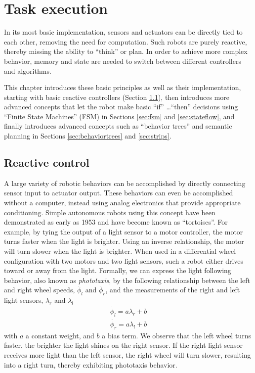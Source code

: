 \chapter{Task execution}
In its most basic implementation, sensors and actuators can be directly tied to each other, removing the need for computation. Such robots are purely reactive, thereby missing the ability to ``think'' or plan. In order to achieve more complex behavior, memory and state are needed to switch between different controllers and algorithms.

This chapter introduces these basic principles as well as their implementation, starting with basic reactive controllers (Section \ref{sec:braitenberg}), then introduces more advanced concepts that let the robot make basic ``if'' \ldots ``then'' decisions using ``Finite State Machines'' (FSM) in Sections \ref{sec:fsm} and \ref{sec:stateflow}, and finally introduces advanced concepts such as ``behavior trees'' and semantic planning in Sections \ref{sec:behaviortrees} and \ref{sec:strips}.

\section{Reactive control}\label{sec:braitenberg}
A large variety of robotic behaviors can be accomplished by directly connecting sensor input to actuator output. These behaviors can even be accomplished without a computer, instead using analog electronics that provide appropriate conditioning. Simple autonomous robots using this concept have been demonstrated as early as 1953 \cite{walter1953living} and have become known as ``tortoises''. For example, by tying the output of a light sensor to a motor controller, the motor turns faster when the light is brighter. Using an inverse relationship, the motor will turn slower when the light is brighter. When used in a differential wheel configuration with two motors and two light sensors, such a robot either drives toward or away from the light. Formally, we can express the light following behavior, also known as \emph{phototaxis}, by the following relationship between 
the left and right wheel speeds, $\dot{\phi_l}$ and $\dot{\phi_r}$, and the measurements of the right and left light sensors, $\lambda_r$ and $\lambda_l$
\begin{eqnarray}\label{eq:simplereactive}
\dot{\phi_l}=a \lambda_r + b\\
\dot{\phi_r}=a \lambda_l + b
\end{eqnarray}
with $a$ a constant weight, and $b$ a bias term. We observe that the left wheel turns faster, the brighter the light shines on the right sensor. If the right light sensor receives more light than the left sensor, the right wheel will turn slower, resulting into a right turn, thereby exhibiting phototaxis behavior.

